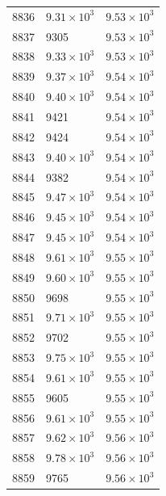 \begin{table}[H]
\begin{tabular}{lll}
8836 & $\displaystyle 9.31 \times 10^{3}$ & $\displaystyle 9.53 \times 10^{3}$ \\
8837 & 9305 & $\displaystyle 9.53 \times 10^{3}$ \\
8838 & $\displaystyle 9.33 \times 10^{3}$ & $\displaystyle 9.53 \times 10^{3}$ \\
8839 & $\displaystyle 9.37 \times 10^{3}$ & $\displaystyle 9.54 \times 10^{3}$ \\
8840 & $\displaystyle 9.40 \times 10^{3}$ & $\displaystyle 9.54 \times 10^{3}$ \\
8841 & 9421 & $\displaystyle 9.54 \times 10^{3}$ \\
8842 & 9424 & $\displaystyle 9.54 \times 10^{3}$ \\
8843 & $\displaystyle 9.40 \times 10^{3}$ & $\displaystyle 9.54 \times 10^{3}$ \\
8844 & 9382 & $\displaystyle 9.54 \times 10^{3}$ \\
8845 & $\displaystyle 9.47 \times 10^{3}$ & $\displaystyle 9.54 \times 10^{3}$ \\
8846 & $\displaystyle 9.45 \times 10^{3}$ & $\displaystyle 9.54 \times 10^{3}$ \\
8847 & $\displaystyle 9.45 \times 10^{3}$ & $\displaystyle 9.54 \times 10^{3}$ \\
8848 & $\displaystyle 9.61 \times 10^{3}$ & $\displaystyle 9.55 \times 10^{3}$ \\
8849 & $\displaystyle 9.60 \times 10^{3}$ & $\displaystyle 9.55 \times 10^{3}$ \\
8850 & 9698 & $\displaystyle 9.55 \times 10^{3}$ \\
8851 & $\displaystyle 9.71 \times 10^{3}$ & $\displaystyle 9.55 \times 10^{3}$ \\
8852 & 9702 & $\displaystyle 9.55 \times 10^{3}$ \\
8853 & $\displaystyle 9.75 \times 10^{3}$ & $\displaystyle 9.55 \times 10^{3}$ \\
8854 & $\displaystyle 9.61 \times 10^{3}$ & $\displaystyle 9.55 \times 10^{3}$ \\
8855 & 9605 & $\displaystyle 9.55 \times 10^{3}$ \\
8856 & $\displaystyle 9.61 \times 10^{3}$ & $\displaystyle 9.55 \times 10^{3}$ \\
8857 & $\displaystyle 9.62 \times 10^{3}$ & $\displaystyle 9.56 \times 10^{3}$ \\
8858 & $\displaystyle 9.78 \times 10^{3}$ & $\displaystyle 9.56 \times 10^{3}$ \\
8859 & 9765 & $\displaystyle 9.56 \times 10^{3}$ \\

\end{tabular}
\end{table}
